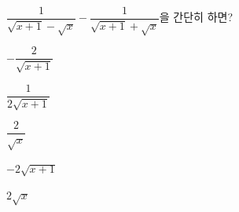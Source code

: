 $\dfrac{1}{\sqrt{x+1}-\sqrt{x}}-\dfrac{1}{\sqrt{x+1}+\sqrt{x}}$을 간단히 하면?
\begin{choices32}{\rule[-3ex]{0pt}{8ex}$-\dfrac{2}{\sqrt{x+1}}$}{\rule[-3ex]{0pt}{8ex}$\dfrac{1}{2\sqrt{x+1}}$}{\rule[-3ex]{0pt}{8ex}$\dfrac{2}{\sqrt{x}}$}{\rule[-3ex]{0pt}{8ex}$-2\sqrt{x+1}$}{\rule[-3ex]{0pt}{8ex}$2\sqrt{x}$}\end{choices32}
